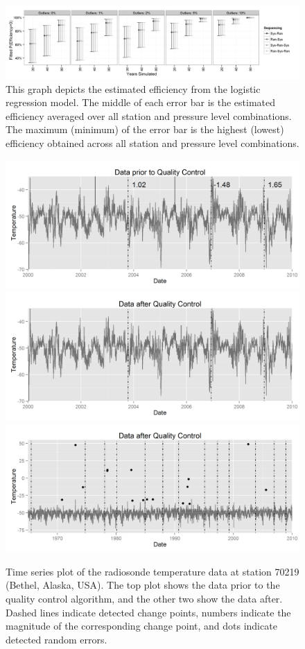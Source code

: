 \documentclass[12pt]{article}
\begin{document}
\begin{figure}[h!]
	\centering
	\includegraphics[width=\textwidth]{Efficiency_Order_Plot_BW}
	\caption{This graph depicts the estimated efficiency from the logistic regression model.  The middle of each error bar is the estimated efficiency averaged over all station and pressure level combinations.  The maximum (minimum) of the error bar is the highest (lowest) efficiency obtained across all station and pressure level combinations.}
	\label{fig:fitEffOrd}
\end{figure}


\begin{figure}
	\centering
	\includegraphics[width=.9\textwidth]{"70219_Data_Unhomogenized_zoomed"}
	\includegraphics[width=.9\textwidth]{"70219_Data_Homogenized_zoomed"}
	\includegraphics[width=.9\textwidth]{"70219_Data_Homogenized"}	
	\caption{Time series plot of the radiosonde temperature data at station 70219 (Bethel, Alaska, USA).  The top plot shows the data prior to the quality control algorithm, and the other two show the data after.  Dashed lines indicate detected change points, numbers indicate the magnitude of the corresponding change point, and dots indicate detected random errors.}
	\label{fig:caseStudy}
\end{figure}

\end{document}
